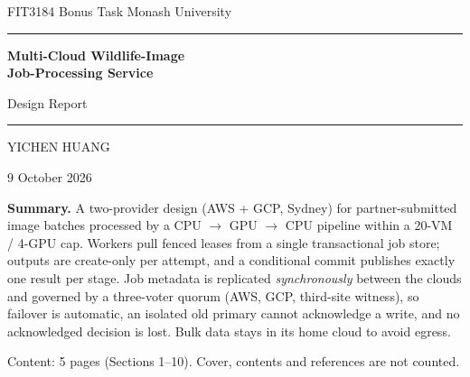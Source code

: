 \documentclass[10pt,a4paper]{article}
\newcommand*{\studentid}{35860537}
\begin{document}
\begin{titlepage}
\centering
\vspace*{3.2cm}
{\large FIT3184 \textbullet{} Bonus Task \textbullet{} Monash University\par}
\vspace{1.2cm}
{\color{accent}\rule{\linewidth}{1.2pt}\par}
\vspace{0.5cm}
{\huge\bfseries Multi-Cloud Wildlife-Image\\[4pt] Job-Processing Service\par}
\vspace{0.3cm}
{\Large Design Report\par}
\vspace{0.5cm}
{\color{accent}\rule{\linewidth}{1.2pt}\par}
\vspace{1.5cm}
{\Large YICHEN HUANG\par}
\ifx\studentid\empty\else\vspace{0.2cm}{\large Student ID: \studentid\par}\fi
\vspace{0.4cm}
{\large 9 October 2026\par}
\vfill
\begin{minipage}{0.84\linewidth}\small
\textbf{Summary.} A two-provider design (AWS + GCP, Sydney) for partner-submitted image batches processed
by a CPU $\rightarrow$ GPU $\rightarrow$ CPU pipeline within a 20-VM / 4-GPU cap. Workers pull fenced leases from a
single transactional job store; outputs are create-only per attempt, and a conditional commit publishes
exactly one result per stage. Job metadata is replicated \emph{synchronously} between the clouds and
governed by a three-voter quorum (AWS, GCP, third-site witness), so failover is automatic, an isolated
old primary cannot acknowledge a write, and no acknowledged decision is lost. Bulk data stays in its home
cloud to avoid egress.
\end{minipage}
\vspace{1.2cm}

{\small Content: 5 pages (Sections 1--10). Cover, contents and references are not counted.\par}
\end{titlepage}

\setcounter{page}{1}
\tableofcontents
\vspace{1cm}
\listoffigures
\listoftables
\clearpage
\end{document}
